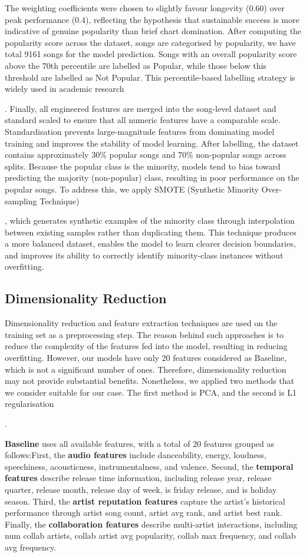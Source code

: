 \documentclass{article}
\begin{document}
The weighting coefficients were chosen to slightly favour longevity (0.60) over peak performance (0.4), reflecting the hypothesis that sustainable success is more indicative of genuine popularity than brief chart domination. After computing the popularity score across the dataset, songs are categorised by popularity, we have total 9161 songs for the model prediction. Songs with an overall popularity score above the 70th percentile are labelled as Popular, while those below this threshold are labelled as Not Popular. This percentile-based labelling strategy is widely used in academic research {\cite{PhamEtAl2015}. Finally, all engineered features are merged into the song-level dataset and standard scaled to ensure that all numeric features have a comparable scale. Standardisation prevents large-magnitude features from dominating model training and improves the stability of model learning. After labelling, the dataset contains approximately 30\% popular songs and 70\% non-popular songs across splits. Because the popular class is the minority, models tend to bias toward predicting the majority (non-popular) class, resulting in poor performance on the popular songs. To address this, we apply SMOTE (Synthetic Minority Over-sampling Technique) {\cite{smote}, which generates synthetic examples of the minority class through interpolation between existing samples rather than duplicating them. This technique produces a more balanced dataset, enables the model to learn clearer decision boundaries, and improves its ability to correctly identify minority-class instances without overfitting.

\subsection{Dimensionality Reduction}
Dimensionality reduction and feature extraction techniques are used on the training set as a preprocessing step. The reason behind such approaches is to reduce the complexity of the features fed into the model, resulting in reducing overfitting. However, our models have only 20 features considered as Baseline, which is not a significant number of ones. Therefore, dimensionality reduction may not provide substantial benefits. Nonetheless, we applied two methods that we consider suitable for our case. The first method is PCA, and the second is L1 regularisation {\cite{PhamEtAl2015}.

\noindent \textbf{Baseline} uses all available features, with a total of 20 features grouped as follows:First, the \textbf{audio features} include danceability, energy, loudness, speechiness, acousticness, instrumentalness, and valence. Second, the \textbf{temporal features} describe release time information, including release year, release quarter, release month, release day of week, is friday release, and is holiday season. Third, the \textbf{artist reputation features} capture the artist’s historical performance through artist song count, artist avg rank, and artist best rank. Finally, the \textbf{collaboration features} describe multi-artist interactions, including num collab artists, collab artist avg popularity, collab max frequency, and collab avg frequency.




}}}
\end{document}
